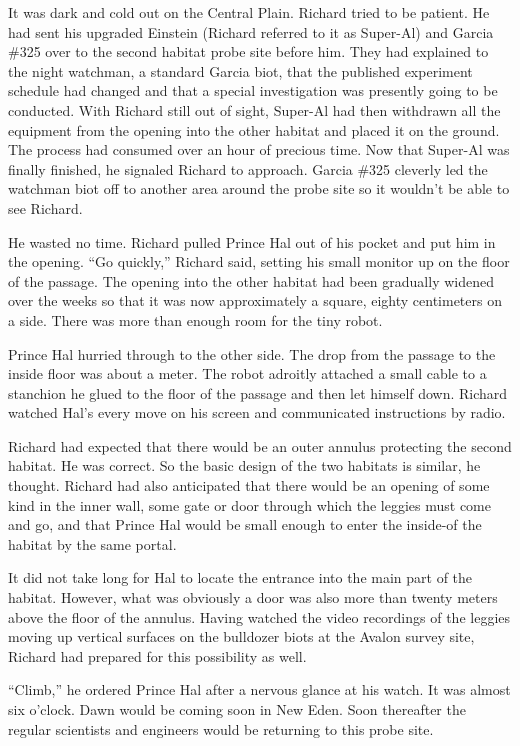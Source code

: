 \documentclass[]{article}
\begin{document}
{It was dark and cold out on the Central Plain.  Richard tried to be patient.  He had sent his upgraded Einstein (Richard referred to it as Super-Al) and Garcia \#325 over to the second habitat probe site before him.  They had explained to the night watchman, a standard Garcia biot, that the published experiment schedule had changed and that a special investigation was presently going to be conducted.  With Richard still out of sight, Super-Al had then withdrawn all the equipment from the opening into the other habitat and placed it on the ground.  The process had consumed over an hour of precious time.  Now that Super-Al was finally finished, he signaled Richard to approach.  Garcia \#325 cleverly led the watchman biot off to another area around the probe site so it wouldn’t be able to see Richard.

He wasted no time.  Richard pulled Prince Hal out of his pocket and put him in the opening.  “Go quickly,” Richard said, setting his small monitor up on the floor of the passage.  The opening into the other habitat had been gradually widened over the weeks so that it was now approximately a square, eighty centimeters on a side.  There was more than enough room for the tiny robot.

Prince Hal hurried through to the other side.  The drop from the passage to the inside floor was about a meter.  The robot adroitly attached a small cable to a stanchion he glued to the floor of the passage and then let himself down.  Richard watched Hal’s every move on his screen and communicated instructions by radio.

Richard had expected that there would be an outer annulus protecting the second habitat.  He was correct.  So the basic design of the two habitats is similar, he thought.  Richard had also anticipated that there would be an opening of some kind in the inner wall, some gate or door through which the leggies must come and go, and that Prince Hal would be small enough to enter the inside-of the habitat by the same portal.

It did not take long for Hal to locate the entrance into the main part of the habitat.  However, what was obviously a door was also more than twenty meters above the floor of the annulus.  Having watched the video recordings of the leggies moving up vertical surfaces on the bulldozer biots at the Avalon survey site, Richard had prepared for this possibility as well.

“Climb,” he ordered Prince Hal after a nervous glance at his watch.  It was almost six o’clock.  Dawn would be coming soon in New Eden.  Soon thereafter the regular scientists and engineers would be returning to this probe site.

}
\end{document}
